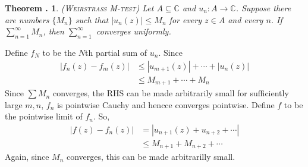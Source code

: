 \documentclass[twoside]{report}
\newcommand{\C}{\mathbb{C}}
\newcounter{Lecture}
\theoremstyle{myts}
\newcounter{c}[Lecture]
\newtheorem{thm}[c]{Theorem \arabic{Lecture}.}
\newenvironment{prf}{
  \noindent\begin{mdframed}[style=prf]}{\end{mdframed} \vspace{1em}
}
\begin{document}
\begin{thm}
  ({\scshape Weirstrass M-test}) Let \(A\subseteq\C\) and \( u_n : A \to \C \). Suppose there are numbers \( \{ M_n \} \) such that \(  | u_n(z) | \leq M_n \) for every \(z\in A\) and every $n$. If \( \sum_{n=1}^\infty M_n \), then \( \sum_{n=1}^\infty \) converges uniformly.
\end{thm}

\begin{prf}
  Define $f_N$ to be the $N$th partial sum of $u_n$. Since
  \begin{align*}
    | f_n(z) - f_m(z) | &\leq |u_{m+1}(z)| + \cdots + |u_{n}(z)| \\
      &\leq M_{m+1} + \cdots + M_{n}
  \end{align*}
  Since \(\sum M_n\) converges, the RHS can be made arbitrarily small for sufficiently large $m,n$, $f_n$ is pointwise Cauchy and hencce converges pointwise. Define $f$ to be the pointwise limit of $f_n$. So,
  \begin{align*}
    | f(z) - f_n(z) | &= | u_{n+1}(z) + u_{n+2} + \cdots | \\
      &\leq M_{n+1} + M_{n+2} + \cdots
  \end{align*}
  Again, since $M_n$ converges, this can be made arbitrarilly small. 
\end{prf}
\end{document}
